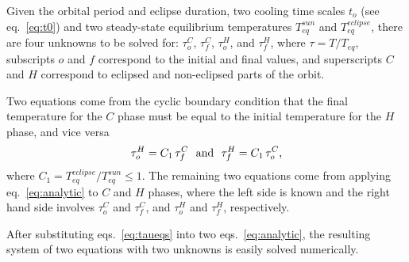 \documentclass[]{aastex62}
\def\eq#1{\begin{equation} #1 \end{equation}}
\begin{document}
\vskip 0.2in

\vskip 0.1in
Given the orbital period and eclipse duration, two cooling time scales $t_o$ (see eq.~\ref{eq:t0}) and two 
steady-state equilibrium temperatures $T_{eq}^{sun}$ and $T_{eq}^{eclipse}$, there are four unknowns to 
be solved for: $\tau_o^C$, $\tau_f^C$, $\tau_o^H$, and $\tau_f^H$, where $\tau=T/T_{eq}$, subscripts 
$o$ and $f$ correspond to the initial and final values, and superscripts $C$ and $H$ correspond to 
eclipsed and non-eclipsed parts of the orbit. 
 
Two equations come from the cyclic boundary condition that the final temperature for the $C$ phase
must be equal to the initial temperature for the $H$ phase, and vice versa
\eq{
\label{eq:taueqs}
     \tau_o^H = C_1 \,\tau_f^C \,\,  \,\,   {\rm and} \,\, \,\,   \tau_f^H = C_1 \, \tau_o^C,
} 
where $C_1 =  T_{eq}^{eclipse}/T_{eq}^{sun} \le 1$. The remaining two equations come
from applying eq.~\ref{eq:analytic} to $C$ and $H$ phases, where the left side is known and the right
hand side involves $\tau_o^C$ and $\tau_f^C$, and $\tau_o^H$ and $\tau_f^H$, respectively. 

After substituting eqs.~\ref{eq:taueqs} into two eqs.~\ref{eq:analytic}, the resulting system of 
two equations with two unknowns is easily solved numerically.  
   
\end{document}
